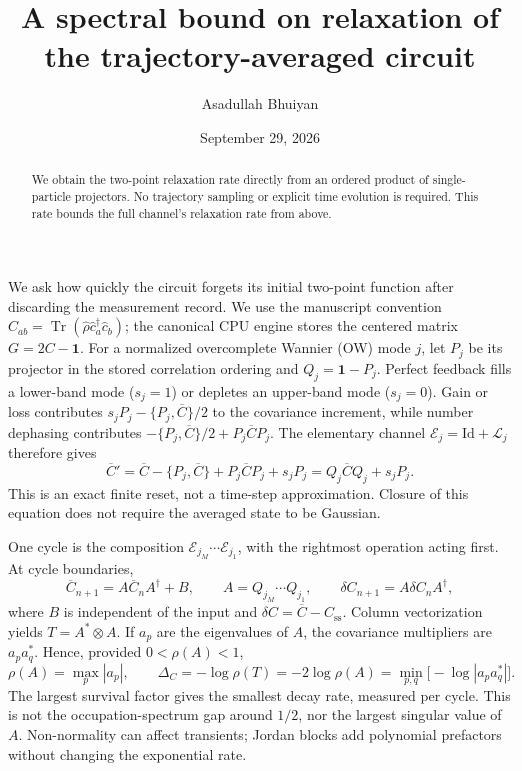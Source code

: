 \documentclass[aps,prb,onecolumn,nofootinbib,superscriptaddress]{revtex4-2}
\begin{document}
\title{A spectral bound on relaxation of the trajectory-averaged circuit}
\author{Asadullah Bhuiyan}
\date{September 29, 2026}
\begin{abstract}
We obtain the two-point relaxation rate directly from an ordered product of
single-particle projectors. No trajectory sampling or explicit time evolution
is required. This rate bounds the full channel's relaxation rate from above.
\end{abstract}
\maketitle

We ask how quickly the circuit forgets its initial two-point function after
discarding the measurement record. We use the manuscript convention
$C_{ab}=\operatorname{Tr}(\hat\rho\hat c_a^\dagger\hat c_b)$; the canonical
CPU engine stores the centered matrix $G=2C-\mathbf{1}$.
For a normalized overcomplete Wannier (OW) mode $j$, let $P_j$ be its
projector in the stored correlation ordering and $Q_j=\mathbf{1}-P_j$.
Perfect feedback fills a lower-band mode ($s_j=1$) or depletes an upper-band
mode ($s_j=0$). Gain or loss contributes
$s_jP_j-\{P_j,\overline C\}/2$ to the covariance increment, while number
dephasing contributes $-\{P_j,\overline C\}/2+P_j\overline C P_j$.
The elementary channel $\mathcal E_j=\mathrm{Id}+\mathcal L_j$ therefore gives
\begin{equation}
 \overline C'=\overline C-\{P_j,\overline C\}
       +P_j\overline C P_j+s_jP_j
       =Q_j\overline C Q_j+s_jP_j.
\end{equation}
This is an exact finite reset, not a time-step approximation. Closure of
this equation does not require the averaged state to be Gaussian.

One cycle is the composition $\mathcal E_{j_M}\cdots\mathcal E_{j_1}$,
with the rightmost operation acting first. At cycle boundaries,
\begin{equation}
 \overline C_{n+1}=A\overline C_nA^\dagger+B,
 \qquad A=Q_{j_M}\cdots Q_{j_1},\qquad
 \delta C_{n+1}=A\delta C_nA^\dagger,
\end{equation}
where $B$ is independent of the input and
$\delta C=\overline C-C_{\mathrm{ss}}$. Column vectorization yields
$T=A^*\otimes A$. If $a_p$ are the eigenvalues of $A$, the covariance
multipliers are $a_pa_q^*$. Hence, provided $0<\rho(A)<1$,
\begin{equation}
 \rho(A)=\max_p|a_p|,\qquad
 \Delta_C=-\log\rho(T)=-2\log\rho(A)
       =\min_{p,q}\bigl[-\log|a_pa_q^*|\bigr].
\end{equation}
The largest survival factor gives the smallest decay rate, measured per
cycle. This is not the occupation-spectrum gap around $1/2$, nor the
largest singular value of $A$. Non-normality can affect transients;
Jordan blocks add polynomial prefactors without changing the exponential rate.
\end{document}
